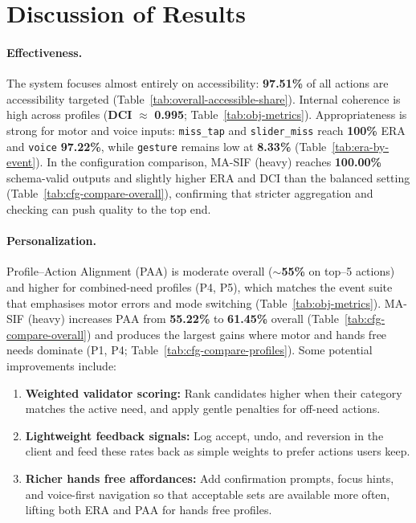 \section{Discussion of Results}
\label{sec:discussion_eval}

\paragraph{Effectiveness.}
The system focuses almost entirely on accessibility: \textbf{97.51\%} of all actions are accessibility targeted (Table~\ref{tab:overall-accessible-share}). Internal coherence is high across profiles (\textbf{DCI} $\approx$ \textbf{0.995}; Table~\ref{tab:obj-metrics}). Appropriateness is strong for motor and voice inputs: \texttt{miss\_tap} and \texttt{slider\_miss} reach \textbf{100\%} ERA and \texttt{voice} \textbf{97.22\%}, while \texttt{gesture} remains low at \textbf{8.33\%} (Table~\ref{tab:era-by-event}). In the configuration comparison, MA-SIF (heavy) reaches \textbf{100.00\%} schema-valid outputs and slightly higher ERA and DCI than the balanced setting (Table~\ref{tab:cfg-compare-overall}), confirming that stricter aggregation and checking can push quality to the top end.

\paragraph{Personalization.}
Profile–Action Alignment (PAA) is moderate overall (\(\sim\)\textbf{55\%} on top–5 actions) and higher for combined-need profiles (P4, P5), which matches the event suite that emphasises motor errors and mode switching (Table~\ref{tab:obj-metrics}). MA-SIF (heavy) increases PAA from \textbf{55.22\%} to \textbf{61.45\%} overall (Table~\ref{tab:cfg-compare-overall}) and produces the largest gains where motor and hands free needs dominate (P1, P4; Table~\ref{tab:cfg-compare-profiles}). Some potential improvements include:
\begin{enumerate}
  \item \textbf{Weighted validator scoring:} Rank candidates higher when their category matches the active need, and apply gentle penalties for off-need actions.
  \item \textbf{Lightweight feedback signals:} Log accept, undo, and reversion in the client and feed these rates back as simple weights to prefer actions users keep.
  \item \textbf{Richer hands free affordances:} Add confirmation prompts, focus hints, and voice-first navigation so that acceptable sets are available more often, lifting both ERA and PAA for hands free profiles.
\end{enumerate}

